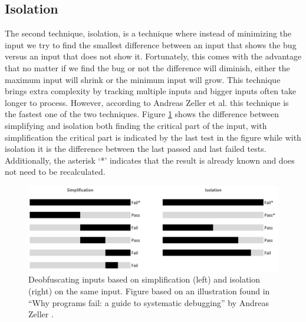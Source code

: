 \subsection{Isolation}
\label{inputReduction:Isolation}
The second technique, isolation, is a technique where instead of minimizing the input we try to find the smallest difference between an input that shows the bug versus an input that does not show it. Fortunately, this comes with the advantage that no matter if we find the bug or not the difference will diminish, either the maximum input will shrink or the minimum input will grow. 
This technique brings extra complexity by tracking multiple inputs and bigger inputs often take longer to process. However, according to Andreas Zeller et al. \cite{5zeller2002simplifyingIsolatingFailure-inducing} this technique is the fastest one of the two techniques. 
Figure \ref{fig:simplificationIsolation} shows the difference between simplifying and isolation both finding the critical part of the input, with simplification the critical part is indicated by the last test in the figure while with isolation it is the difference between the last passed and last failed tests. Additionally, the  asterisk ‘*’ indicates that the result is already known and does not need to be recalculated.
\begin{figure}
	\centering
	\includegraphics[width=1.0\textwidth]{images/simplificationIsolation}
	\caption{Deobfuscating inputs based on simplification (left) and isolation (right) on the same input. Figure based on an illustration found in “Why programs fail: a guide to systematic debugging” by Andreas Zeller \cite{bookZellerwhyProgramsFail}.}
	\label{fig:simplificationIsolation}
\end{figure}

